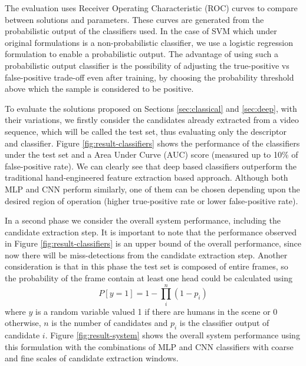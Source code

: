     The evaluation uses Receiver Operating Characteristic (ROC) curves \cite{evaluationMetrics} to compare between solutions and parameters. These curves are generated from the probabilistic output of the classifiers used. In the case of SVM which under original formulations is a non-probabilistic classifier, we use a logistic regression formulation \cite{svmProbabilisticOutput} to enable a probabilistic output. The advantage of using such a probabilistic output classifier is the possibility of adjusting the true-positive vs false-positive trade-off even after training, by choosing the probability threshold above which the sample is considered to be positive.

    To evaluate the solutions proposed on Sections \ref{sec:classical} and \ref{sec:deep}, with their variations, we firstly consider the candidates already extracted from a video sequence, which will be called the test set, thus evaluating only the descriptor and classifier. Figure \ref{fig:result-classifiers} shows the performance of the classifiers under the test set and a Area Under Curve (AUC) score \cite{evaluationMetrics} (measured up to 10\% of false-positive rate). We can clearly see that deep based classifiers outperform the traditional hand-engineered feature extraction based approach. Although both MLP and CNN perform similarly, one of them can be chosen depending upon the desired region of operation (higher true-positive rate or lower false-positive rate).


    \begin{figure*}[!t]
    \centering
    \label{fig:result-classifiers-all}
    \hfil
    \caption{Classifiers performance.}
    \label{fig:result-classifiers}
    \end{figure*}
    In a second phase we consider the overall system performance, including the candidate extraction step. It is important to note that the performance observed in Figure \ref{fig:result-classifiers} is an upper bound of the overall performance, since now there will be miss-detections from the candidate extraction step. Another consideration is that in this phase the test set is composed of entire frames, so the probability of the frame contain at least one head could be calculated using
    \begin{equation}
    P[y=1] = 1 - \prod_i^n (1-p_i)
    \end{equation}
    where $y$ is a random variable valued 1 if there are humans in the scene or 0 otherwise, $n$ is the number of candidates and $p_i$ is the classifier output of candidate $i$. Figure \ref{fig:result-system} shows the overall system performance using this formulation with the combinations of MLP and CNN classifiers with coarse and fine scales of candidate extraction windows.

